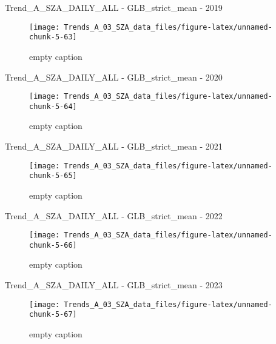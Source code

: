 \documentclass[
  10pt,
  a4paper,oneside]{article}
\begin{document}
Trend\_A\_SZA\_DAILY\_ALL - GLB\_strict\_mean - 2019

\begin{figure}[!ht]

{\centering \texttt{[image: Trends\_A\_03\_SZA\_data\_files/figure-latex/unnamed-chunk-5-63]} 

}

\caption{ empty caption }\label{fig:unnamed-chunk-5-63}
\end{figure}

Trend\_A\_SZA\_DAILY\_ALL - GLB\_strict\_mean - 2020

\begin{figure}[!ht]

{\centering \texttt{[image: Trends\_A\_03\_SZA\_data\_files/figure-latex/unnamed-chunk-5-64]} 

}

\caption{ empty caption }\label{fig:unnamed-chunk-5-64}
\end{figure}

Trend\_A\_SZA\_DAILY\_ALL - GLB\_strict\_mean - 2021

\begin{figure}[!ht]

{\centering \texttt{[image: Trends\_A\_03\_SZA\_data\_files/figure-latex/unnamed-chunk-5-65]} 

}

\caption{ empty caption }\label{fig:unnamed-chunk-5-65}
\end{figure}

Trend\_A\_SZA\_DAILY\_ALL - GLB\_strict\_mean - 2022

\begin{figure}[!ht]

{\centering \texttt{[image: Trends\_A\_03\_SZA\_data\_files/figure-latex/unnamed-chunk-5-66]} 

}

\caption{ empty caption }\label{fig:unnamed-chunk-5-66}
\end{figure}

Trend\_A\_SZA\_DAILY\_ALL - GLB\_strict\_mean - 2023

\begin{figure}[!ht]

{\centering \texttt{[image: Trends\_A\_03\_SZA\_data\_files/figure-latex/unnamed-chunk-5-67]} 

}

\caption{ empty caption }\label{fig:unnamed-chunk-5-67}
\end{figure}
\end{document}
